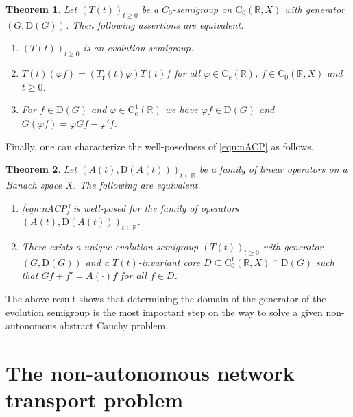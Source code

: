 \documentclass[a4paper,oneside,10pt]{amsart}
\newtheorem{theorem}{Theorem}[section]
\theoremstyle{definition}
\numberwithin{equation}{section}
\newenvironment{abc}{\begin{enumerate}[{\rm (a)}]}{\end{enumerate}}
\def\dom{\mathrm{D}}
\def\RR{\mathbb{R}}
\begin{document}
\begin{theorem}\label{thm:CharEvoSemi}{ \cite[Thm.~VI.9.14]{EN}}
Let $(T(t))_{t\geq0}$ be a $C_0$-semigroup on $\mathrm{C}_0(\RR,X)$ with generator $(G,\dom(G))$. Then following assertions are equivalent.
\begin{abc}
	\item $(T(t))_{t\geq0}$ is an evolution semigroup.
	\item $T(t)(\varphi f)=(T_\mathrm{r}(t)\varphi)T(t)f$ for all $\varphi\in\mathrm{C}_{\mathrm{c}}(\RR)$, $f\in\mathrm{C}_0(\RR,X)$ and $t\geq0$.
	\item For $f\in\dom(G)$ and $\varphi\in\mathrm{C}_{\mathrm{c}}^1(\RR)$ we have $\varphi f\in\dom(G)$ and $G(\varphi f)=\varphi Gf-\varphi'f$.
\end{abc}
\end{theorem}

Finally, one can characterize the well-posedness of \eqref{eqn:nACP} as follows.

\begin{theorem}\label{thm:WPEvoSemi}{\cite[Thm.~2.9]{N1997}}
Let $(A(t),\dom(A(t)))_{t\in\RR}$ be a family of linear operators on a Banach space $X$. The following are equivalent.
\begin{abc}
	\item \eqref{eqn:nACP} is well-posed for the family of operators $(A(t),\dom(A(t)))_{t\in\RR}$.
	\item There exists a unique evolution semigroup $(T(t))_{t\geq0}$ with generator $(G,\dom(G))$ and a $T(t)$-invariant core $D\subseteq\mathrm{C}_0^1(\RR,X)\cap\dom(G)$ such that $Gf+f'=A(\cdot)f$ for all $f\in D$.
\end{abc}
\end{theorem}

The above result shows that determining the domain of the generator of the evolution semigroup is the most important step on the way to solve a given non-autonomous abstract Cauchy problem. 


\section{The non-autonomous network transport problem}
\end{document}
